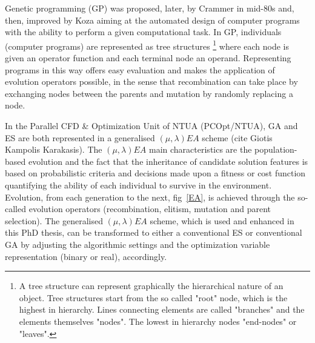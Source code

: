 Genetic programming (GP) was proposed, later, by Crammer in mid-80s \cite{cramer85} and, then, improved by Koza \cite{Koz94} aiming at the automated design of computer programs with the ability to perform a given computational task. In GP, individuals (computer programs) are represented as tree structures \footnote{A tree structure can represent graphically the hierarchical nature of an object. Tree structures start from the so called "root" node, which is the highest in hierarchy. Lines connecting elements are called "branches" and the elements themselves "nodes". The lowest in hierarchy nodes  "end-nodes" or "leaves". } where each node is given an operator function and each terminal node an operand. Representing programs in this way offers easy evaluation and makes the application of evolution operators possible, in the sense that recombination can take place by exchanging nodes between the parents and mutation by randomly replacing a node. 

In the Parallel CFD \& Optimization Unit of NTUA (PCOpt/NTUA), GA and ES are both represented in a generalised $(\mu,\lambda)EA$ scheme (cite Giotis Kampolis Karakasis).  The $(\mu,\lambda)EA$ main characteristics are the population-based evolution and the fact that the inheritance of candidate solution features is based on probabilistic criteria and decisions made upon a fitness or cost function quantifying the ability of each individual to survive in the environment. Evolution, from each generation to the next, fig~\ref{EA}, is achieved through the so-called evolution operators (recombination, elitism, mutation and parent selection). The generalised $(\mu,\lambda)EA$ scheme, which is used and enhanced in this PhD thesis, can be transformed to either a conventional ES or conventional GA by adjusting the algorithmic settings and the optimization variable representation (binary or real), accordingly.  

